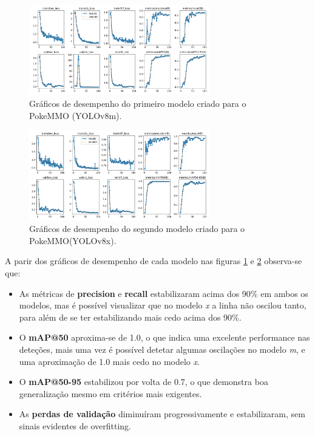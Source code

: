 \begin{figure}[h]
    \centering
    \includegraphics[width=0.7\textwidth]{imagens/results_modelom.png}
    \caption{Gráficos de desempenho do primeiro modelo criado para o PokeMMO (YOLOv8m).}
    \label{fig:results_modelom}
\end{figure}

\begin{figure}[h]
    \centering
    \includegraphics[width=0.7\textwidth]{imagens/results_modelox.png}
    \caption{Gráficos de desempenho do segundo modelo criado para o PokeMMO(YOLOv8x).}
    \label{fig:results_modelox}
\end{figure}

A parir dos gráficos de desempenho de cada modelo nas figuras \ref{fig:results_modelom} e \ref{fig:results_modelox} observa-se que:

\begin{itemize}
    \item As métricas de \textbf{precision} e \textbf{recall} estabilizaram acima dos 90\% em ambos os modelos, mas é possível visualizar que no modelo \textit{x} a linha não oscilou tanto, para além de se ter estabilizando mais cedo acima dos 90\%.
    
    \item O \textbf{mAP@50} aproxima-se de 1.0, o que indica uma excelente performance nas deteções, mais uma vez é possível detetar algumas oscilações no modelo \textit{m}, e uma aproximação de 1.0 mais cedo no modelo \textit{x}.
    
    \item O \textbf{mAP@50-95} estabilizou por volta de 0.7, o que demonstra boa generalização mesmo em critérios mais exigentes.
    
    \item As \textbf{perdas de validação} diminuíram progressivamente e estabilizaram, sem sinais evidentes de overfitting.
\end{itemize}


